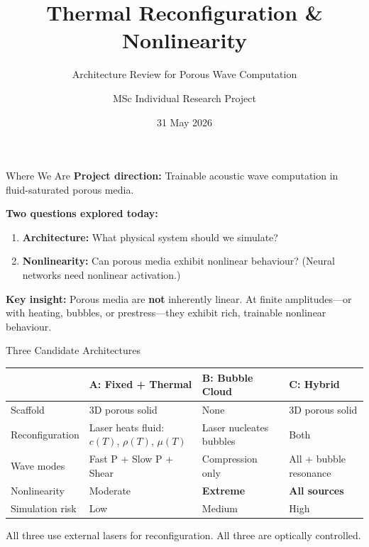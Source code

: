 \documentclass[aspectratio=169,11pt]{beamer}
\title{Thermal Reconfiguration \& Nonlinearity}
\subtitle{Architecture Review for Porous Wave Computation}
\author{MSc Individual Research Project}
\institute{Cranfield University\hspace{0.3cm}|\hspace{0.3cm}Supervisors: Prof. Weisi Guo, Prof. Takis Tsoutsanis}
\date{31 May 2026}
\begin{document}
\begin{frame}[plain]
  \titlepage
\end{frame}

\begin{frame}{Where We Are}
  \textbf{Project direction:} Trainable acoustic wave computation in fluid-saturated porous media.

  \vspace{0.3cm}
  \textbf{Two questions explored today:}
  \begin{enumerate}
    \item \textbf{Architecture:} What physical system should we simulate?
    \item \textbf{Nonlinearity:} Can porous media exhibit nonlinear behaviour? (Neural networks need nonlinear activation.)
  \end{enumerate}

  \vspace{0.3cm}
  \textbf{Key insight:} Porous media are \textbf{not} inherently linear. At finite amplitudes---or with heating, bubbles, or prestress---they exhibit rich, trainable nonlinear behaviour.
\end{frame}

\begin{frame}{Three Candidate Architectures}
  \begin{table}
    \centering
    \footnotesize
    \renewcommand{\arraystretch}{1.05}
    \begin{tabular}{@{}>{\raggedright}p{2.6cm}>{\raggedright}p{3.4cm}>{\raggedright}p{3.4cm}>{\raggedright\arraybackslash}p{3.8cm}@{}}
      \toprule
      & \textbf{A: Fixed + Thermal} & \textbf{B: Bubble Cloud} & \textbf{C: Hybrid} \\
      \midrule
      Scaffold & 3D porous solid & None & 3D porous solid \\
      Reconfiguration & Laser heats fluid: $c(T)$, $\rho(T)$, $\mu(T)$ & Laser nucleates bubbles & Both \\
      Wave modes & Fast P + Slow P + Shear & Compression only & All + bubble resonance \\
      Nonlinearity & Moderate & \textbf{Extreme} & \textbf{All sources} \\
      Simulation risk & Low & Medium & High \\
      \bottomrule
    \end{tabular}
  \end{table}

  \vspace{0.15cm}
  \textcolor{gdpDarkBlue}{\small All three use external lasers for reconfiguration. All three are optically controlled.}
\end{frame}
\end{document}
